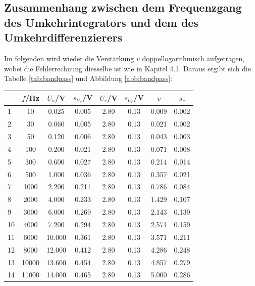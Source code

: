 \subsection*{Zusammenhang zwischen dem Frequenzgang des Umkehrintegrators und dem des Umkehrdifferenzierers}
Im folgenden wird wieder die Verstärkung $v$ doppellogarithmisch aufgetragen, wobei die Fehlerrechnung diesselbe ist wie in Kapitel 4.1. Daraus ergibt sich die Tabelle \ref{tab:bandpass} und Abbildung \ref{abb:bandpass}:
\begin{center}
    \begin{tabular}{l | c c c c c | c c}
        {} & $f$/Hz  & $U_a$/V & $s_{U_a}$/V & $U_e$/V & $s_{U_e}$/V & $v$   & $s_v$ \\
        \hline
        1  & 10      & 0.025   & 0.005       & 2.80    & 0.13        & 0.009 & 0.002 \\
        2  & 30      & 0.060   & 0.005       & 2.80    & 0.13        & 0.021 & 0.002 \\
        3  & 50      & 0.120   & 0.006       & 2.80    & 0.13        & 0.043 & 0.003 \\
        4  & 100     & 0.200   & 0.021       & 2.80    & 0.13        & 0.071 & 0.008 \\
        5  & 300     & 0.600   & 0.027       & 2.80    & 0.13        & 0.214 & 0.014 \\
        6  & 500     & 1.000   & 0.036       & 2.80    & 0.13        & 0.357 & 0.021 \\
        7  & 1000    & 2.200   & 0.211       & 2.80    & 0.13        & 0.786 & 0.084 \\
        8  & 2000    & 4.000   & 0.233       & 2.80    & 0.13        & 1.429 & 0.107 \\
        9  & 3000    & 6.000   & 0.269       & 2.80    & 0.13        & 2.143 & 0.139 \\
        10 & 4000    & 7.200   & 0.294       & 2.80    & 0.13        & 2.571 & 0.159 \\
        11 & 6000    & 10.000  & 0.361       & 2.80    & 0.13        & 3.571 & 0.211 \\
        12 & 8000    & 12.000  & 0.412       & 2.80    & 0.13        & 4.286 & 0.248 \\
        13 & 10000   & 13.600  & 0.454       & 2.80    & 0.13        & 4.857 & 0.279 \\
        14 & 11000   & 14.000  & 0.465       & 2.80    & 0.13        & 5.000 & 0.286 \\

\end{tabular}
\end{center}
